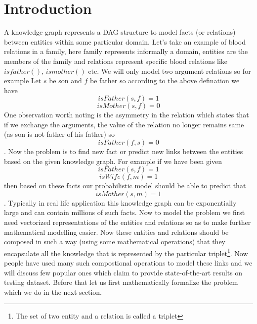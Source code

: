 \documentclass[12pt]{article}
\begin{document}
\section{Introduction}
A knowledge graph represents a DAG structure to model facts (or relations) between entities within some particular domain. Let's take an example of blood relations in a family, here family represents informally a domain, entities are the members of the family and relations represent specific blood relations like $isfather()$, $ismother()$ etc. We will only model two argument relations so for example Let $s$ be son and $f$ be father so according to the above defination we have
\[
isFather(s, f)=1
\]
\[
isMother(s, f)=0
\]One observation worth noting is the asymmetry in the relation which states that if we exchange the arguments, the value of the relation no longer remains same (as son is not father of his father) so 
\[
isFather(f, s)=0
\]
. Now the problem is to find new fact or predict new links between the entities based on the given knowledge graph. For example if we have been given 
\[
isFather(s, f)=1
\]
\[
isWife(f, m)=1
\] then based on these facts our probabilistic model should be able to predict that 
\[
isMother(s, m)=1
\]. Typically in real life application this knowledge graph can be exponentially large and can contain millions of such facts. Now to model the problem we first need vectorized representations of the entities and relations so as to make further mathematical modelling easier. Now these entities and relations should be composed in such a way (using some mathematical operations) that they encapsulate all the knowledge that is represented by the particular triplet\footnote{The set of two entity and a relation is called a triplet}. Now people have used many such compostional operations to model these links and we will discuss few popular ones which claim to provide state-of-the-art results on testing dataset. Before that let us first mathematically formalize the problem which we do in the next section. 
\end{document}
